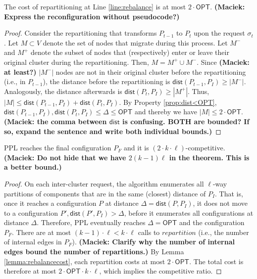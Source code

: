 \documentclass[manuscript,screen=true, review, anonymous]{acmart}
\newcommand{\OPT}{\textsf{OPT}\xspace}
\newcommand{\PPL}{\textsf{PPL}\xspace}
\newcommand{\dist}{\textsf{dist}}
\newcommand\mahmoud[1]{\color{orange}\textbf{Mahmoud: #1~}\color{black}}
\newcommand\maciek[1]{\color{brown}\textbf{(Maciek: #1)}\color{black}}
\begin{document}
\begin{lemma}	\label{lemma:rebalancecost}
	The cost of repartitioning at Line \ref{line:rebalance} is at most $2\cdot\OPT$.
	\maciek{Express the reconfiguration without pseudocode?}
\end{lemma}
\begin{proof}
	Consider the repartitioning that transforms $P_{t-1}$ to $P_t$ upon the request $\sigma_t$.
	Let $M \subset V$ denote the set of nodes that migrate during this process.
	Let $M^-$ and $M^+$ denote the subset of nodes that (respectively)
	enter or leave their original cluster during the repartitioning.    
	Then,
	$M = M^+ \cup M^-$.
	Since \maciek{at least?} $|M^-|$ nodes are not in their original cluster before the repartitioning (i.e., in $P_{t-1}$),
	the distance before the repartitioning is $\dist(P_{t-1},P_I) \geq | M^-|$.
	Analogously,
	the distance afterwards is $\dist(P_{t},P_I) \geq | M^+|$.
	Thus,
	$|M| \leq \dist(P_{t-1},P_I) + \dist(P_{t},P_I)$.
	By Property \ref{prop:dist<OPT},
	$\dist(P_{t-1},P_I) , \dist(P_{t},P_I) \leq \Delta \leq \OPT$
	and thereby we have	
	$|M| \leq 2\cdot\OPT$.
	\maciek{the comma between $\dist$ is confusing. BOTH are bounded? If so, expand the sentence and write both individual bounds.}
\end{proof}

\begin{theorem}	\label{thm:upperbound}
	\PPL reaches the final configuration $P_F$ and it is $(2\cdot k\cdot\ell)$-competitive.
	\maciek{Do not hide that we have $2(k-1)\ell$ in the theorem. This is a better bound.}
\end{theorem}
\begin{proof}
	On each inter-cluster request,
	the algorithm enumerates all $\ell$-way partitions of components
	that are in the same (closest) distance of $P_I$.
	That is, 
	once it reaches a configuration $P$ at distance $\Delta = \dist(P, P_I)$,
	it does not move to a configuration
	$P', \dist(P', P_I) > \Delta$,
	before it enumerates all configurations at distance $\Delta$.
	Therefore,
	\PPL eventually reaches $\Delta=\OPT$ and the configuration $P_F$.
	There are at most $(k-1)\cdot\ell < k\cdot\ell $ calls   to $\mathit{repartition}$
	(i.e., the number of internal edges in $P_F$).
	\maciek{Clarify why the number of internal edges bound the number of repartitions.}
	By Lemma \ref{lemma:rebalancecost},
	each repartition costs at most $2\cdot\OPT$.
	The total cost is therefore at most $2\cdot\OPT\cdot k\cdot\ell$, which implies the competitive ratio.
\end{proof}
\end{document}
